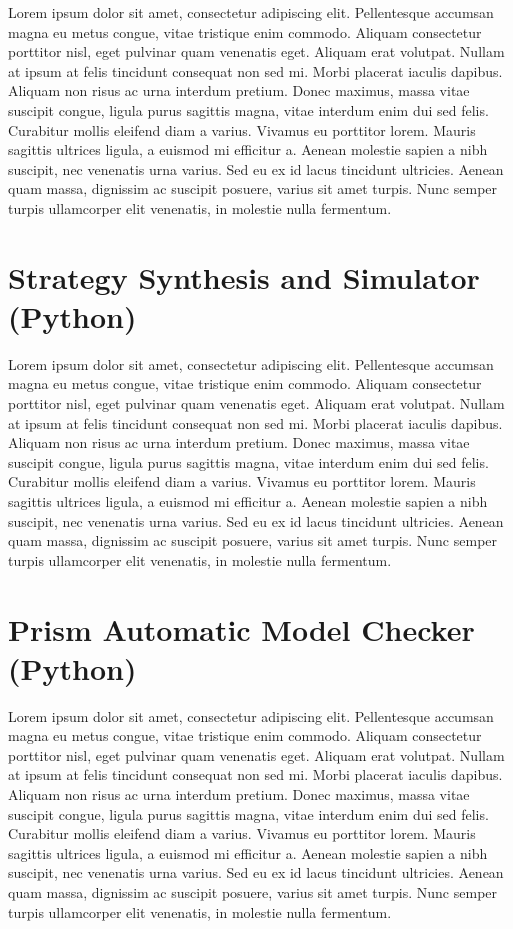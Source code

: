 Lorem ipsum dolor sit amet, consectetur adipiscing elit. Pellentesque accumsan magna eu metus congue, vitae tristique enim commodo. Aliquam consectetur porttitor nisl, eget pulvinar quam venenatis eget. Aliquam erat volutpat. Nullam at ipsum at felis tincidunt consequat non sed mi. Morbi placerat iaculis dapibus. Aliquam non risus ac urna interdum pretium. Donec maximus, massa vitae suscipit congue, ligula purus sagittis magna, vitae interdum enim dui sed felis. Curabitur mollis eleifend diam a varius. Vivamus eu porttitor lorem. Mauris sagittis ultrices ligula, a euismod mi efficitur a. Aenean molestie sapien a nibh suscipit, nec venenatis urna varius. Sed eu ex id lacus tincidunt ultricies. Aenean quam massa, dignissim ac suscipit posuere, varius sit amet turpis. Nunc semper turpis ullamcorper elit venenatis, in molestie nulla fermentum.

\section{Strategy Synthesis and Simulator (Python)}

Lorem ipsum dolor sit amet, consectetur adipiscing elit. Pellentesque accumsan magna eu metus congue, vitae tristique enim commodo. Aliquam consectetur porttitor nisl, eget pulvinar quam venenatis eget. Aliquam erat volutpat. Nullam at ipsum at felis tincidunt consequat non sed mi. Morbi placerat iaculis dapibus. Aliquam non risus ac urna interdum pretium. Donec maximus, massa vitae suscipit congue, ligula purus sagittis magna, vitae interdum enim dui sed felis. Curabitur mollis eleifend diam a varius. Vivamus eu porttitor lorem. Mauris sagittis ultrices ligula, a euismod mi efficitur a. Aenean molestie sapien a nibh suscipit, nec venenatis urna varius. Sed eu ex id lacus tincidunt ultricies. Aenean quam massa, dignissim ac suscipit posuere, varius sit amet turpis. Nunc semper turpis ullamcorper elit venenatis, in molestie nulla fermentum.

\section{Prism Automatic Model Checker (Python)}

Lorem ipsum dolor sit amet, consectetur adipiscing elit. Pellentesque accumsan magna eu metus congue, vitae tristique enim commodo. Aliquam consectetur porttitor nisl, eget pulvinar quam venenatis eget. Aliquam erat volutpat. Nullam at ipsum at felis tincidunt consequat non sed mi. Morbi placerat iaculis dapibus. Aliquam non risus ac urna interdum pretium. Donec maximus, massa vitae suscipit congue, ligula purus sagittis magna, vitae interdum enim dui sed felis. Curabitur mollis eleifend diam a varius. Vivamus eu porttitor lorem. Mauris sagittis ultrices ligula, a euismod mi efficitur a. Aenean molestie sapien a nibh suscipit, nec venenatis urna varius. Sed eu ex id lacus tincidunt ultricies. Aenean quam massa, dignissim ac suscipit posuere, varius sit amet turpis. Nunc semper turpis ullamcorper elit venenatis, in molestie nulla fermentum.

